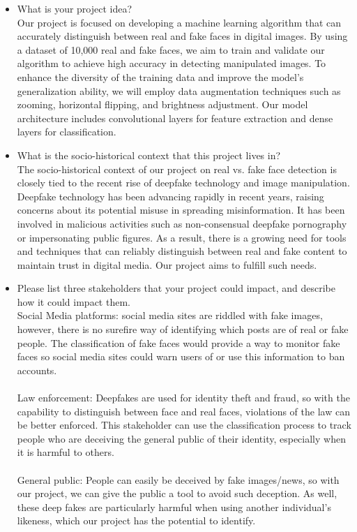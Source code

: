 \begin{itemize}
  \item What is your project idea?  \\Our project is focused on developing a machine learning algorithm that can accurately distinguish between real and fake faces in digital images. By using a dataset of 10,000 real and fake faces, we aim to train and validate our algorithm to achieve high accuracy in detecting manipulated images. To enhance the diversity of the training data and improve the model's generalization ability, we will employ data augmentation techniques such as zooming, horizontal flipping, and brightness adjustment. Our model architecture includes convolutional layers for feature extraction and dense layers for classification.

  \item What is the socio-historical context that this project lives in? \\The socio-historical context of our project on real vs. fake face detection is closely tied to the recent rise of deepfake technology and image manipulation. Deepfake technology has been advancing rapidly in recent years, raising concerns about its potential misuse in spreading misinformation. It has been involved in malicious activities such as non-consensual deepfake pornography or impersonating public figures. As a result, there is a growing need for tools and techniques that can reliably distinguish between real and fake content to maintain trust in digital media. Our project aims to fulfill such needs.

  \item Please list three stakeholders that your project could impact, and describe how it could impact them. \\Social Media platforms: social media sites are riddled with fake images, however, there is no surefire way of identifying which posts are of real or fake people. The classification of fake faces would provide a way to monitor fake faces so social media sites could warn users of or use this information to ban accounts. \\\\
Law enforcement: Deepfakes are used for identity theft and fraud, so with the capability to distinguish between face and real faces, violations of the law can be better enforced. This stakeholder can use the classification process to track people who are deceiving the general public of their identity, especially when it is harmful to others.\\\\
General public: People can easily be deceived by fake images/news, so with our project, we can give the public a tool to avoid such deception. As well, these deep fakes are particularly harmful when using another individual’s likeness, which our project has the potential to identify.


\end{itemize}
